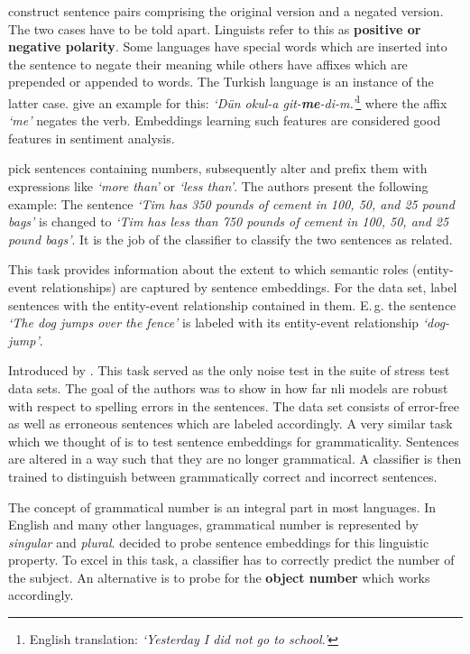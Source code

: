   \citep{Naik.2018} construct sentence pairs comprising the original version and a negated version. The two cases have to be told apart. Linguists refer to this as \textbf{positive or negative polarity}. Some languages have special words which are inserted into the sentence to negate their meaning while others have affixes which are prepended or appended to words. The Turkish language is an instance of the latter case. \citep{Sahin.2019} give an example for this: \textit{`Dün okul-a git-\textbf{me}-di-m.'}\footnote{English translation: \textit{`Yesterday I did not go to school.'}} where the affix \textit{`me'} negates the verb. Embeddings learning such features are considered good features in sentiment analysis.

  \citep{Naik.2018} pick sentences containing numbers, subsequently alter and prefix them with expressions like \textit{`more than'} or \textit{`less than'}. The authors present the following example: The sentence \textit{`Tim has 350 pounds of cement in 100, 50, and 25 pound bags'} is changed to \textit{`Tim has less than 750 pounds of cement in 100, 50, and 25 pound bags'}. It is the job of the classifier to classify the two sentences as related.

  This task provides information about the extent to which semantic roles (entity-event relationships) are captured by sentence embeddings. For the data set, \citep{Ettinger.2016} label sentences with the entity-event relationship contained in them. E.\,g. the sentence \textit{`The dog jumps over the fence'} is labeled with its entity-event relationship \textit{`dog-jump'}.

  Introduced by \citep{Naik.2018}. This task served as the only noise test in the suite of stress test data sets. The goal of the authors was to show in how far \gls{nli} models are robust with respect to spelling errors in the sentences. The data set consists of error-free as well as erroneous sentences which are labeled accordingly. A very similar task which we thought of is to test sentence embeddings for grammaticality. Sentences are altered in a way such that they are no longer grammatical. A classifier is then trained to distinguish between grammatically correct and incorrect sentences.

  The concept of grammatical number is an integral part in most languages. In English and many other languages, grammatical number is represented by \textit{singular} and \textit{plural}. \citep{Conneau.2018a} decided to probe sentence embeddings for this linguistic property. To excel in this task, a classifier has to correctly predict the number of the subject. An alternative is to probe for the \textbf{object number} which works accordingly.

